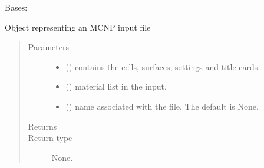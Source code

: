 \documentclass[letterpaper,10pt,english]{sphinxmanual}
\begin{document}
\begin{fulllineitems}
\label{\detokenize{api/inputgeneration:inputfile.D1S5_InputFile}}
\sphinxAtStartPar
Bases: {\hyperref[\detokenize{api/inputgeneration:inputfile.D1S_Input}]{}}

\sphinxAtStartPar
Object representing an MCNP input file
\begin{quote}\begin{description}
\item[{Parameters}] \leavevmode\begin{itemize}
\item {} 
\sphinxAtStartPar
{} () \textendash{} contains the cells, surfaces, settings and title cards.

\item {} 
\sphinxAtStartPar
{} () \textendash{} material list in the input.

\item {} 
\sphinxAtStartPar
{} (\sphinxstyleliteralemphasis{\sphinxupquote{, }}) \textendash{} name associated with the file. The default is None.

\end{itemize}

\item[{Returns}] \leavevmode
\sphinxAtStartPar


\item[{Return type}] \leavevmode
\sphinxAtStartPar
None.

\end{description}\end{quote}


\end{fulllineitems}
\end{document}
